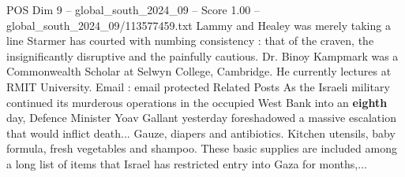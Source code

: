 \begin{textsample}{POS Dim 9 – global\_south\_2024\_09 – Score 1.00 – global\_south\_2024\_09/113577459.txt}
Lammy and Healey was merely taking a line Starmer has courted with numbing consistency : that of the craven, the insignificantly disruptive and the painfully cautious.
Dr.
Binoy Kampmark was a Commonwealth Scholar at Selwyn College, Cambridge.
He currently lectures at RMIT University.
Email : email protected Related Posts As the Israeli military continued its murderous operations in the occupied West Bank into an \textbf{eighth} day, Defence Minister Yoav Gallant yesterday foreshadowed a massive escalation that would inflict death...
Gauze, diapers and antibiotics.
Kitchen utensils, baby formula, fresh vegetables and shampoo.
These basic supplies are included among a long list of items that Israel has restricted entry into Gaza for months,...

\end{textsample}
